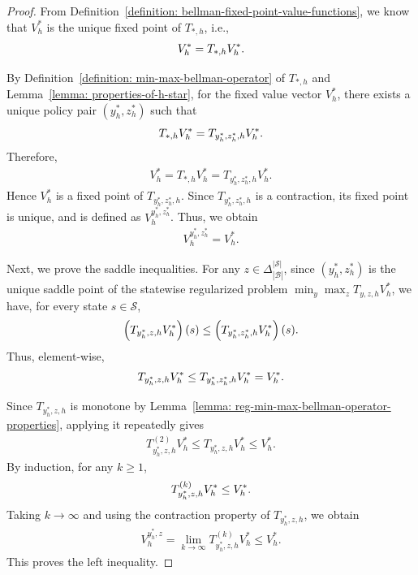\documentclass{article}
\theoremstyle{plain}
\theoremstyle{definition}
\theoremstyle{remark}
\def\cB{\mathcal B}
\def\cS{\mathcal S}
\begin{document}
\begin{proof}
    From Definition~\ref{definition: bellman-fixed-point-value-functions},
    we know that $V_h^*$ is the unique fixed point of $T_{*,h}$, i.e.,
    \begin{align}
        V_h^* = T_{*,h}V_h^* .\notag
    \end{align}

    By Definition~\ref{definition: min-max-bellman-operator} of $T_{*,h}$
    and Lemma~\ref{lemma: properties-of-h-star}, for the fixed value vector
    $V_h^*$, there exists a unique policy pair $(y_h^*,z_h^*)$ such that
    \begin{align}
        T_{*,h}V_h^*
        =
        T_{y_h^*,z_h^*,h}V_h^* .\notag
    \end{align}
    Therefore,
    \begin{align}
        V_h^*
        =
        T_{*,h}V_h^*
        =
        T_{y_h^*,z_h^*,h}V_h^* .
    \end{align}
    Hence $V_h^*$ is a fixed point of $T_{y_h^*,z_h^*,h}$. Since
    $T_{y_h^*,z_h^*,h}$ is a contraction, its fixed point is unique, and is defined as $V^{y_h^*,z_h^*}_h$. Thus, we obtain
    \begin{align}
        V_h^{y_h^*,z_h^*}
        =
        V_h^* .
    \end{align}

    Next, we prove the saddle inequalities. For any
    $z\in\Delta_{|\cB|}^{|\cS|}$, since $(y_h^*,z_h^*)$ is the unique
    saddle point of the statewise regularized problem $\min_{y} \max_{z} T_{y,z,h} V_h^*$,
    we have, for every state $s\in\cS$,
    \begin{align}
        \left(T_{y_h^*,z,h}V_h^*\right)(s)
        \le
        \left(T_{y_h^*,z_h^*,h}V_h^*\right)(s).\notag
    \end{align}
    Thus, element-wise,
    \begin{align}
        T_{y_h^*,z,h}V_h^*
        \le
        T_{y_h^*,z_h^*,h}V_h^*
        =
        V_h^* .\notag
    \end{align}

    Since $T_{y_h^*,z,h}$ is monotone by Lemma~\ref{lemma: reg-min-max-bellman-operator-properties}, applying it repeatedly gives
    \begin{align}
        T_{y_h^*,z,h}^{(2)}V_h^*
        \le
        T_{y_h^*,z,h}V_h^*
        \le
        V_h^* .
    \end{align}
    By induction, for any $k\ge 1$,
    \begin{align}
        T_{y_h^*,z,h}^{(k)}V_h^*
        \le
        V_h^* .\notag
    \end{align}
    Taking $k\to\infty$ and using the contraction property of
    $T_{y_h^*,z,h}$, we obtain
    \begin{align}
        V_h^{y_h^*,z}
        =
        \lim_{k\to\infty}
        T_{y_h^*,z,h}^{(k)}V_h^*
        \le
        V_h^* .
    \end{align}
    This proves the left inequality.


\end{proof}
\end{document}
